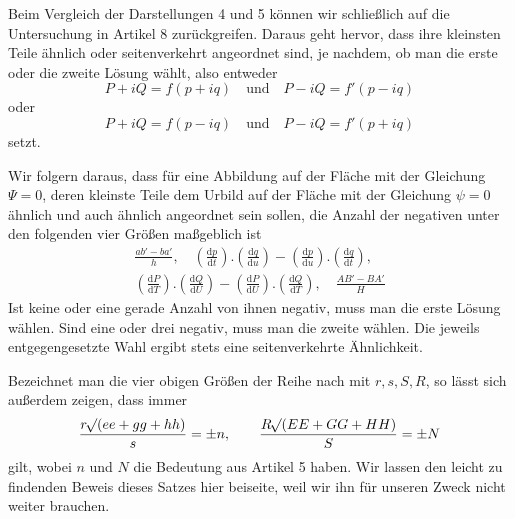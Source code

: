 Beim Vergleich der Darstellungen 4 und 5 können wir schließlich auf die Untersuchung in Artikel 8 zurückgreifen. Daraus geht hervor, dass ihre kleinsten Teile ähnlich oder seitenverkehrt angeordnet sind, je nachdem, ob man die erste oder die zweite Lösung wählt, also entweder
\[
P+iQ=f(p+iq)\quad\text{und}\quad P-iQ=f'(p-iq)
\]
\noindent oder
\[
P+iQ=f(p-iq)\quad\text{und}\quad P-iQ=f'(p+iq)
\]
\noindent setzt.

Wir folgern daraus, dass für eine Abbildung auf der Fläche mit der Gleichung \(\Psi=0\), deren kleinste Teile dem Urbild auf der Fläche mit der Gleichung \(\psi=0\) ähnlich und auch ähnlich angeordnet sein sollen, die Anzahl der negativen unter den folgenden vier Größen maßgeblich ist
\[
\begin{gathered}
\frac{ab'-ba'}{h},\quad (\frac{\mathrm{d}p}{\mathrm{d}t})\mathord{.}(\frac{\mathrm{d}q}{\mathrm{d}u})-(\frac{\mathrm{d}p}{\mathrm{d}u})\mathord{.}(\frac{\mathrm{d}q}{\mathrm{d}t}),\\
(\frac{\mathrm{d}P}{\mathrm{d}T})\mathord{.}(\frac{\mathrm{d}Q}{\mathrm{d}U})-(\frac{\mathrm{d}P}{\mathrm{d}U})\mathord{.}(\frac{\mathrm{d}Q}{\mathrm{d}T}),\quad \frac{AB'-BA'}{H}
\end{gathered}
\]
\noindent Ist keine oder eine gerade Anzahl von ihnen negativ, muss man die erste Lösung wählen. Sind eine oder drei negativ, muss man die zweite wählen. Die jeweils entgegengesetzte Wahl ergibt stets eine seitenverkehrte Ähnlichkeit.
\par\indent{}%
Bezeichnet man die vier obigen Größen der Reihe nach mit \(r,s,S,R\), so lässt sich außerdem zeigen, dass immer
\[
\frac{r\mathord{{}^{}\!\surd}(ee+gg+hh)}{s}=\pm n,\qquad\frac{R\mathord{{}^{}\!\surd}(EE+GG+HH)}{S}=\pm N
\]
\noindent gilt, wobei \(n\) und \(N\) die Bedeutung aus Artikel 5 haben. Wir lassen den leicht zu findenden Beweis dieses Satzes hier beiseite, weil wir ihn für unseren Zweck nicht weiter brauchen.

